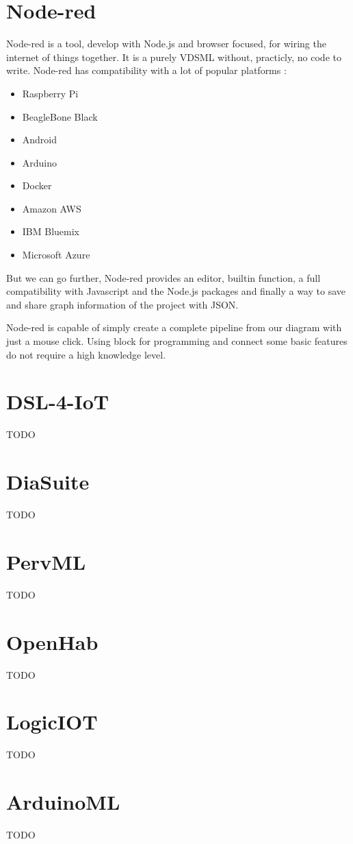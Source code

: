 \section{Node-red}
\label{sec:node-red}

Node-red\cite{node-red} is a tool, develop with Node.js and browser focused, for
wiring the internet of things together. It is a purely VDSML without, practicly,
no code to write. Node-red has compatibility with a lot of popular platforms\cite{node-red} :
\begin{itemize}
\item Raspberry Pi
\item BeagleBone Black
\item Android
\item Arduino
\item Docker
\item Amazon AWS
\item IBM Bluemix
\item Microsoft Azure
\end{itemize}

But we can go further, Node-red provides an editor, builtin function, a full
compatibility with Javascript and the Node.js packages and finally a way to save
and share graph information of the project with JSON.

Node-red is capable of simply create a complete pipeline from our diagram with
just a mouse click. Using block for programming and connect some basic features
do not require a high knowledge level.

\section{DSL-4-IoT}
\label{sec:dsl-4-iot}

TODO

\section{DiaSuite}
\label{sec:diasuite}

TODO
\section{PervML}
\label{sec:pervml}

TODO
\section{OpenHab}
\label{sec:openhab}

TODO
\section{LogicIOT}
\label{sec:logic-iot}

TODO
\section{ArduinoML}
\label{sec:arduino-ml}

TODO

